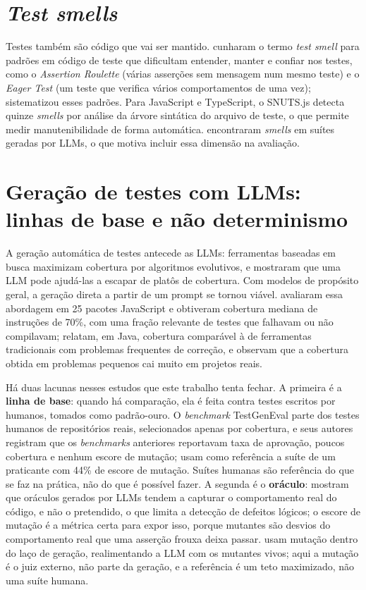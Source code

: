 \section{\textit{Test smells}}

Testes também são código que vai ser mantido.  cunharam o termo \textit{test smell} para padrões em código de teste que dificultam entender, manter e confiar nos testes, como o \textit{Assertion Roulette} (várias asserções sem mensagem num mesmo teste) e o \textit{Eager Test} (um teste que verifica vários comportamentos de uma vez);  sistematizou esses padrões. Para JavaScript e TypeScript, o SNUTS.js \cite{oliveira2024snuts} detecta quinze \textit{smells} por análise da árvore sintática do arquivo de teste, o que permite medir manutenibilidade de forma automática.  encontraram \textit{smells} em suítes geradas por LLMs, o que motiva incluir essa dimensão na avaliação.

\section{Geração de testes com LLMs: linhas de base e não determinismo}

A geração automática de testes antecede as LLMs: ferramentas baseadas em busca maximizam cobertura por algoritmos evolutivos, e  mostraram que uma LLM pode ajudá-las a escapar de platôs de cobertura. Com modelos de propósito geral, a geração direta a partir de um prompt se tornou viável.  avaliaram essa abordagem em 25 pacotes JavaScript e obtiveram cobertura mediana de instruções de 70\%, com uma fração relevante de testes que falhavam ou não compilavam;  relatam, em Java, cobertura comparável à de ferramentas tradicionais com problemas frequentes de correção, e  observam que a cobertura obtida em problemas pequenos cai muito em projetos reais.

Há duas lacunas nesses estudos que este trabalho tenta fechar. A primeira é a \textbf{linha de base}: quando há comparação, ela é feita contra testes escritos por humanos, tomados como padrão-ouro. O \textit{benchmark} TestGenEval \cite{jain2025testgeneval} parte dos testes humanos de repositórios reais, selecionados apenas por cobertura, e seus autores registram que os \textit{benchmarks} anteriores reportavam taxa de aprovação, poucos cobertura e nenhum escore de mutação;  usam como referência a suíte de um praticante com 44\% de escore de mutação. Suítes humanas são referência do que se faz na prática, não do que é possível fazer. A segunda é o \textbf{oráculo}:  mostram que oráculos gerados por LLMs tendem a capturar o comportamento real do código, e não o pretendido, o que limita a detecção de defeitos lógicos; o escore de mutação é a métrica certa para expor isso, porque mutantes são desvios do comportamento real que uma asserção frouxa deixa passar.  usam mutação dentro do laço de geração, realimentando a LLM com os mutantes vivos; aqui a mutação é o juiz externo, não parte da geração, e a referência é um teto maximizado, não uma suíte humana.

